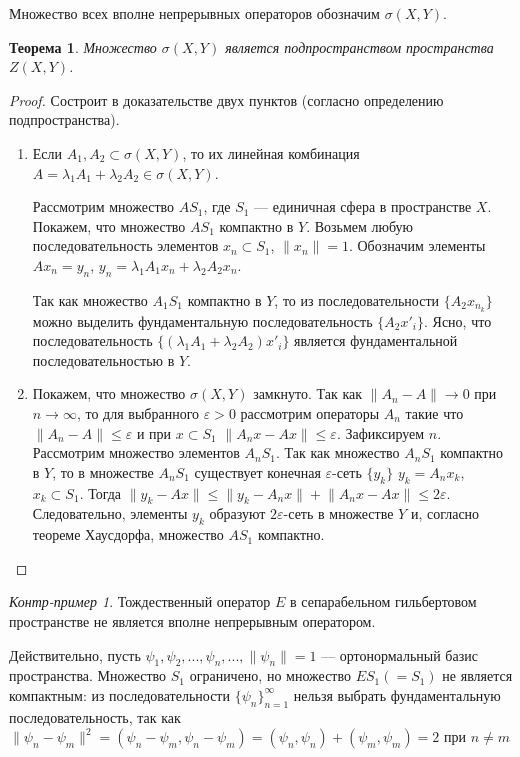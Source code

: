 \documentclass[12pt,a4paper,titlepage, oneside]{book}
\theoremstyle{definition}
\theoremstyle{plain}
\newtheorem*{theorem}{Теорема}
\theoremstyle{remark}
\theoremstyle{remark}
\theoremstyle{remark}
\theoremstyle{remark}
\newtheorem*{cexample}{Контр-пример}
\theoremstyle{plain}
\theoremstyle{plain}
\begin{document}
Множество всех вполне непрерывных операторов обозначим $\sigma(X,Y)$.
\begin{theorem}Множество $\sigma(X,Y)$ является подпространством пространства $Z(X, Y)$.
\end{theorem}
\begin{proof}Состроит в доказательстве двух пунктов (согласно определению подпространства).

\begin{enumerate}

	\item Если $A_1, A_2 \subset \sigma(X,Y)$, то их линейная комбинация $A=\lambda_1 A_1+\lambda_2 A_2\in \sigma(X,Y)$.

Рассмотрим множество $AS_1$, где $S_1$ --- единичная сфера в пространстве $X$. Покажем, что множество $AS_1$ компактно в $Y$. Возьмем любую последовательность элементов $x_n \subset S_1$, $\lVert x_n \rVert=1$. Обозначим элементы $Ax_n=y_n$, $y_n=\lambda_1 A_1 x_n+\lambda_2 A_2 x_n$.

Так как множество $A_1S_1$ компактно в $Y$, то из последовательности $\lbrace A_2x_{n_k} \rbrace$ можно выделить фундаментальную последовательность $\lbrace A_2x'_i \rbrace$. Ясно, что последовательность $\lbrace (\lambda_1 A_1+\lambda_2 A_2)x'_i \rbrace$ является фундаментальной последовательностью в $Y$.

	\item Покажем, что множество $\sigma(X,Y)$ замкнуто. Так как $\lVert A_n-A \rVert \to 0$ при $n\to \infty$, то для выбранного $\varepsilon > 0$ рассмотрим операторы $A_n$ такие что $\lVert A_n-A \rVert \leq  \varepsilon$ и при $x \subset S_1$ $\lVert A_n x-Ax\rVert \leq  \varepsilon$. Зафиксируем $n$. Рассмотрим множество элементов $A_n S_1$. Так как множество $A_n S_1$ компактно в $Y$, то в множестве $A_n S_1$ существует конечная $\varepsilon$-сеть $\lbrace y_k \rbrace$ $y_k=A_n x_k$, $x_k \subset S_1$. Тогда $\lVert y_k - Ax\rVert \leq \lVert y_k - A_n x\rVert + \lVert A_n x - Ax\rVert \leq 2\varepsilon$. Следовательно, элементы $y_k$ образуют $2\varepsilon$-сеть в множестве $Y$ и, согласно теореме Хаусдорфа, множество $AS_1$ компактно.

\end{enumerate}
\end{proof}

\begin{cexample}Тождественный оператор $E$ в сепарабельном гильбертовом пространстве не является вполне непрерывным оператором.

Действительно, пусть $\psi_1,\psi_2,...,\psi_n,..., \lVert\psi_n\rVert =1$ --- ортонормальный базис пространства. Множество $S_1$ ограничено, но множество $ES_1 (=S_1)$ не является компактным: из последовательности $\lbrace \psi_n \rbrace_{n=1}^{\infty}$ нельзя выбрать фундаментальную последовательность, так как $\lVert\psi_n - \psi_m \rVert ^2=(\psi_n - \psi_m, \psi_n - \psi_m)= (\psi_n,\psi_n)+ (\psi_m,\psi_m)=2$ при $n \neq m$
\end{cexample}
\end{document}
